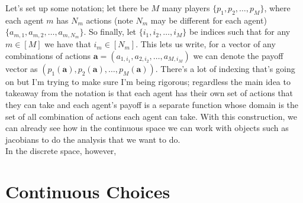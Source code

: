 \documentclass[11pt,english]{article}
\begin{document}
\noindent Let's set up some notation; let there be $M$ many players $\{p_1, p_2, \ldots, p_M\}$, where each agent $m$ has $N_m$ actions (note $N_m$ may be different for each agent) $\{a_{m,1}, a_{m,2}, \ldots, a_{m,N_m}\}$. So finally, let $\{i_1, i_2, \ldots, i_M\}$ be indices such that for any $m\in [M]$ we have that $i_m\in [N_m]$. This lets us write, for a vector of any combinations of actions $\mathbf{a} = (a_{1,i_1}, a_{2, i_2}, \ldots, a_{M, i_M})$ we can denote the payoff vector as $(p_1(\mathbf{a}), p_2(\mathbf{a}), \ldots, p_M(\mathbf{a}))$. There's a lot of indexing that's going on but I'm trying to make sure I'm being rigorous; regardless the main idea to takeaway from the notation is that each agent has their own set of actions that they can take and each agent's payoff is a separate function whose domain is the set of all combination of actions each agent can take. With this construction, we can already see how in the continuous space we can work with objects such as jacobians to do the analysis that we want to do.\\

\noindent In the discrete space, however, 


\section*{Continuous Choices}
\end{document}
